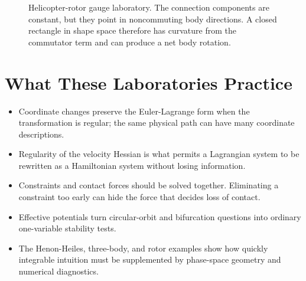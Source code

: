 \begin{figure}[htbp]
\centering
{}
\caption{Helicopter-rotor gauge laboratory. The connection components are
constant, but they point in noncommuting body directions. A closed rectangle in
shape space therefore has curvature from the commutator term and can produce a
net body rotation.}
\label{fig:lab-helicopter-gauge-loop}
\end{figure}
\FloatBarrier

\section{What These Laboratories Practice}
\label{sec:worked-lab-summary}

\begin{itemize}
\item Coordinate changes preserve the Euler-Lagrange form when the
transformation is regular; the same physical path can have many coordinate
descriptions.
\item Regularity of the velocity Hessian is what permits a Lagrangian system to
be rewritten as a Hamiltonian system without losing information.
\item Constraints and contact forces should be solved together. Eliminating a
constraint too early can hide the force that decides loss of contact.
\item Effective potentials turn circular-orbit and bifurcation questions into
ordinary one-variable stability tests.
\item The Henon-Heiles, three-body, and rotor examples show how quickly
integrable intuition must be supplemented by phase-space geometry and
numerical diagnostics.
\end{itemize}

